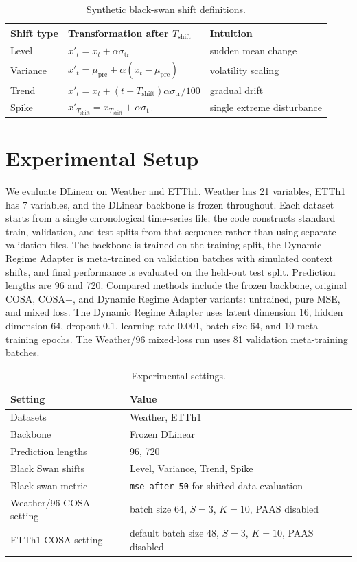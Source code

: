 \documentclass[10pt]{article}
\begin{document}
\begin{table}[H]
\centering
\small
\caption{Synthetic black-swan shift definitions.}
\label{tab:shift-defs}
\begin{tabular}{lll}
\toprule
Shift type & Transformation after $T_{\mathrm{shift}}$ & Intuition \\
\midrule
Level & $x'_t=x_t+\alpha\sigma_{\mathrm{tr}}$ & sudden mean change \\
Variance & $x'_t=\mu_{\mathrm{pre}}+\alpha(x_t-\mu_{\mathrm{pre}})$ & volatility scaling \\
Trend & $x'_t=x_t+(t-T_{\mathrm{shift}})\alpha\sigma_{\mathrm{tr}}/100$ & gradual drift \\
Spike & $x'_{T_{\mathrm{shift}}}=x_{T_{\mathrm{shift}}}+\alpha\sigma_{\mathrm{tr}}$ & single extreme disturbance \\
\bottomrule
\end{tabular}
\end{table}

\section{Experimental Setup}
We evaluate DLinear on Weather and ETTh1. Weather has 21 variables, ETTh1 has 7 variables, and the DLinear backbone is frozen throughout. Each dataset starts from a single chronological time-series file; the code constructs standard train, validation, and test splits from that sequence rather than using separate validation files. The backbone is trained on the training split, the Dynamic Regime Adapter is meta-trained on validation batches with simulated context shifts, and final performance is evaluated on the held-out test split. Prediction lengths are 96 and 720. Compared methods include the frozen backbone, original COSA, COSA+, and Dynamic Regime Adapter variants: untrained, pure MSE, and mixed loss. The Dynamic Regime Adapter uses latent dimension 16, hidden dimension 64, dropout 0.1, learning rate 0.001, batch size 64, and 10 meta-training epochs. The Weather/96 mixed-loss run uses 81 validation meta-training batches.

\begin{table}[h]
\centering
\small
\caption{Experimental settings.}
\label{tab:settings}
\begin{tabular}{ll}
\toprule
Setting & Value \\
\midrule
Datasets & Weather, ETTh1 \\
Backbone & Frozen DLinear \\
Prediction lengths & 96, 720 \\
Black Swan shifts & Level, Variance, Trend, Spike \\
Black-swan metric & \texttt{mse\_after\_50} for shifted-data evaluation \\
Weather/96 COSA setting & batch size 64, $S=3$, $K=10$, PAAS disabled \\
ETTh1 COSA setting & default batch size 48, $S=3$, $K=10$, PAAS disabled \\
\bottomrule
\end{tabular}
\end{table}
\end{document}
